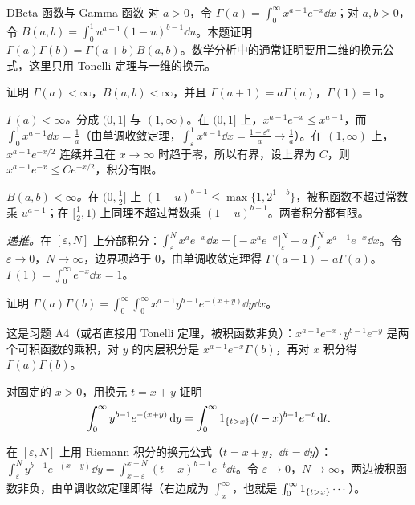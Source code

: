 \thinkingpart

\begin{probleme}[问题]{D}{Beta 函数与 Gamma 函数}
对 $a>0$，令 $\Gamma(a)=\int_0^\infty x^{a-1}e^{-x}\dd x$；对 $a,b>0$，令 $B(a,b)=\int_0^1u^{a-1}(1-u)^{b-1}\dd u$。本题证明 $\Gamma(a)\Gamma(b)=\Gamma(a+b)B(a,b)$。数学分析中的通常证明要用二维的换元公式，这里只用 Tonelli 定理与一维的换元。
\begin{questions}
\item 证明 $\Gamma(a)<\infty$，$B(a,b)<\infty$，并且 $\Gamma(a+1)=a\Gamma(a)$，$\Gamma(1)=1$。
\begin{solution}
\emph{$\Gamma(a)<\infty$。}分成 $(0,1]$ 与 $(1,\infty)$。在 $(0,1]$ 上，$x^{a-1}e^{-x}\leqslant x^{a-1}$，而 $\int_0^1x^{a-1}\dd x=\frac1a$（由单调收敛定理，$\int_\varepsilon^1x^{a-1}\dd x=\frac{1-\varepsilon^a}a\to\frac1a$）。在 $(1,\infty)$ 上，$x^{a-1}e^{-x/2}$ 连续并且在 $x\to\infty$ 时趋于零，所以有界，设上界为 $C$，则 $x^{a-1}e^{-x}\leqslant Ce^{-x/2}$，积分有限。

\emph{$B(a,b)<\infty$。}在 $(0,\frac12]$ 上 $(1-u)^{b-1}\leqslant\max\{1,2^{1-b}\}$，被积函数不超过常数乘 $u^{a-1}$；在 $[\frac12,1)$ 上同理不超过常数乘 $(1-u)^{b-1}$。两者积分都有限。

\emph{递推。}在 $[\varepsilon,N]$ 上分部积分：$\int_\varepsilon^Nx^ae^{-x}\dd x=\bigl[-x^ae^{-x}\bigr]_\varepsilon^N+a\int_\varepsilon^Nx^{a-1}e^{-x}\dd x$。令 $\varepsilon\to0$，$N\to\infty$，边界项趋于 $0$，由单调收敛定理得 $\Gamma(a+1)=a\Gamma(a)$。$\Gamma(1)=\int_0^\infty e^{-x}\dd x=1$。
\end{solution}

\item 证明 $\Gamma(a)\Gamma(b)=\int_0^\infty\int_0^\infty x^{a-1}y^{b-1}e^{-(x+y)}\dd y\dd x$。
\begin{solution}
这是习题 A4（或者直接用 Tonelli 定理，被积函数非负）：$x^{a-1}e^{-x}\cdot y^{b-1}e^{-y}$ 是两个可积函数的乘积，对 $y$ 的内层积分是 $x^{a-1}e^{-x}\Gamma(b)$，再对 $x$ 积分得 $\Gamma(a)\Gamma(b)$。
\end{solution}

\item 对固定的 $x>0$，用换元 $t=x+y$ 证明
\[
\int_0^\infty y^{b-1}e^{-(x+y)}\,\mathrm{d} y=\int_0^\infty1_{\{t>x\}}(t-x)^{b-1}e^{-t}\,\mathrm{d} t .
\]
\begin{solution}
在 $[\varepsilon,N]$ 上用 Riemann 积分的换元公式（$t=x+y$，$\dd t=\dd y$）：$\int_\varepsilon^Ny^{b-1}e^{-(x+y)}\dd y=\int_{x+\varepsilon}^{x+N}(t-x)^{b-1}e^{-t}\dd t$。令 $\varepsilon\to0$，$N\to\infty$，两边被积函数非负，由单调收敛定理即得（右边成为 $\int_x^\infty$，也就是 $\int_0^\infty1_{\{t>x\}}\cdots$）。
\end{solution}


\end{questions}
\end{probleme}
